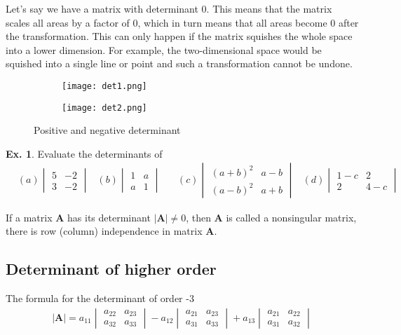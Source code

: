 \documentclass[10pt,a4paper]{book}
\theoremstyle{definition}\newtheorem{definition}{Definition}
\theoremstyle{definition}\newtheorem{fact}{Fact}
\theoremstyle{definition}\newtheorem{ex}{Ex.}
\theoremstyle{definition}\newtheorem{project}{Project}
\theoremstyle{definition}\newtheorem{problem}{Problem}
\theoremstyle{definition}\newtheorem{example}{Example}
\numberwithin{theorem}{chapter}
\numberwithin{corollary}{chapter}
\numberwithin{assumption}{chapter}
\numberwithin{definition}{chapter}
\numberwithin{prop}{chapter}
\numberwithin{notation}{chapter}
\numberwithin{problem}{chapter}
\numberwithin{example}{chapter}
\numberwithin{fact}{chapter}
\numberwithin{ex}{chapter}
\def\A{\mathbf A}
\begin{document}
	Let’s say we have a matrix with determinant 0. This means that the matrix scales all areas by a factor of 0, which in turn means that all areas become 0 after the transformation. This can only happen if the matrix squishes the whole space into a lower dimension. For example, the two-dimensional space would be squished into a single line or point and such a transformation cannot be undone.
	
	\begin{figure}[ht]
		\centering
		\begin{subfigure}[b]{0.4\linewidth}
			\texttt{[image: det1.png]}
		\end{subfigure}
		\begin{subfigure}[b]{0.4\linewidth}
			\texttt{[image: det2.png]}
		\end{subfigure}
		\caption{Positive and negative determinant}
		\label{fig:determinant}
	\end{figure}
	
	\begin{ex}
		Evaluate the determinants of
		\begin{align*}
			&(a) \begin{vmatrix}
				5       & - 2 \\ 3 & -2
			\end{vmatrix}
			&(b) \begin{vmatrix}
				1       & a   \\ a & 1
			\end{vmatrix} \ \ \ \ 
			&(c) \begin{vmatrix}
				(a+b)^2 & a-b \\ (a-b)^2 & a+b
			\end{vmatrix}
			&(d) \begin{vmatrix}
				1-c     & 2   \\ 2 & 4-c
			\end{vmatrix}
		\end{align*}
	\end{ex}
	
	If a matrix $\A$ has its determinant $|\A| \neq 0$, then $\A$ is called a nonsingular matrix, there is row (column) independence in matrix $\A$.
	
	\subsection{Determinant of higher order}
	The formula for the determinant of order -3
	\begin{align*}
		|\A| = a_{11} \begin{vmatrix}
			a_{22} & a_{23} \\
			a_{32} & a_{33} 
		\end{vmatrix} 
		- a_{12}  \begin{vmatrix}
			a_{21} & a_{23} \\
			a_{31} & a_{33} 
		\end{vmatrix} 
		+ a_{13} \begin{vmatrix}
			a_{21} & a_{22} \\
			a_{31} & a_{32} 
		\end{vmatrix} 
	\end{align*}
	
\end{document}
